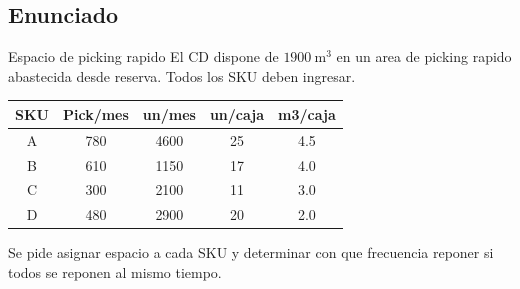 \subsection{Enunciado}

\begin{enunciado}{Espacio de picking rapido}
El CD dispone de \(1900\ \text{m}^3\) en un area de picking rapido abastecida desde reserva. Todos los SKU deben ingresar.

\begin{center}
\begin{tabular}{ccccc}
\toprule
SKU & Pick/mes & un/mes & un/caja & m3/caja \\
\midrule
A & 780 & 4600 & 25 & 4.5 \\
B & 610 & 1150 & 17 & 4.0 \\
C & 300 & 2100 & 11 & 3.0 \\
D & 480 & 2900 & 20 & 2.0 \\
\bottomrule
\end{tabular}
\end{center}

Se pide asignar espacio a cada SKU y determinar con que frecuencia reponer si todos se reponen al mismo tiempo.
\end{enunciado}
